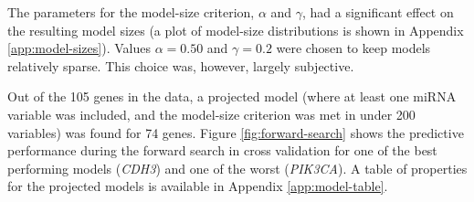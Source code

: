 The parameters for the model-size criterion, $\alpha$ and $\gamma$, had a
significant effect on the resulting model sizes (a plot of model-size
distributions is shown in Appendix \ref{app:model-sizes}).
Values $\alpha = 0.50$ and $\gamma = 0.2$ were chosen to keep models
relatively sparse. This choice was, however, largely subjective.

Out of the
105 genes in the data, a projected model (where at least one miRNA variable
was included, and the model-size criterion was met in under 200 variables) was
found for 74 genes. Figure \ref{fig:forward-search} shows the predictive performance during the
forward search in cross validation for one of the best performing models (\emph{CDH3})
and one of the worst (\emph{PIK3CA}).
A table of properties for the projected models is
available in Appendix \ref{app:model-table}.

